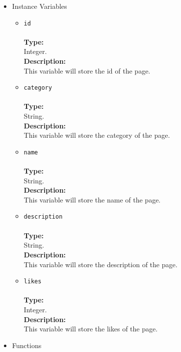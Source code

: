 \begin{itemize}
\begin{itemize}

\item Instance Variables
\label{sec-1-4-2-8-1}%
\begin{itemize}
\item \verb~id~\\\\
\textbf{Type:}\\
     Integer.\\

     \textbf{Description:}\\
     This variable will store the id of the page.\\
\item \verb~category~\\\\
\textbf{Type:}\\
     String.\\

     \textbf{Description:}\\
     This variable will store the category of the page.\\
\item \verb~name~\\\\
\textbf{Type:}\\
     String.\\

     \textbf{Description:}\\
     This variable will store the name of the page.
\item \verb~description~\\\\
\textbf{Type:}\\
     String.\\

     \textbf{Description:}\\
     This variable will store the description of the page.
\item \verb~likes~\\\\
\textbf{Type:}\\
     Integer.\\

     \textbf{Description:}\\
     This variable will store the likes of the page.
\end{itemize}


\item Functions
\label{sec-1-4-2-8-2}%
\begin{itemize}


\end{itemize}
\end{itemize}
\end{itemize}
